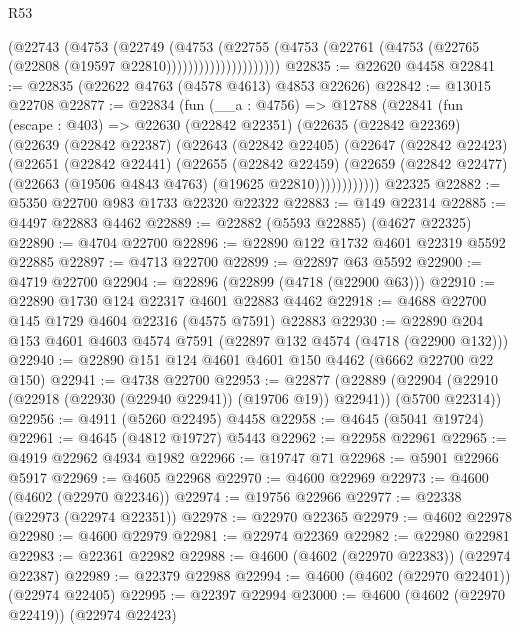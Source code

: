 \begin{lexlean}{R53}
\begin{coremodule}
                        (@22743
                          (@4753
                            (@22749
                              (@4753
                                (@22755
                                  (@4753
                                    (@22761
                                      (@4753 (@22765 (@22808 (@19597 @22810)))))))))))))))))))))
@22835 := @22620 @4458
@22841 := @22835 (@22622 @4763 (@4578 @4613) @4853 @22626)
@22842 := @13015 @22708
@22877 := @22834
    (fun (__a : @4756) =>
    @12788
      (@22841
        (fun (escape : @403) =>
        @22630
          (@22842 @22351)
          (@22635
            (@22842 @22369)
            (@22639
              (@22842 @22387)
              (@22643
                (@22842 @22405)
                (@22647
                  (@22842 @22423)
                  (@22651
                    (@22842 @22441)
                    (@22655
                      (@22842 @22459)
                      (@22659
                        (@22842 @22477)
                        (@22663 (@19506 @4843 @4763) (@19625 @22810))))))))))))
    @22325
@22882 := @5350 @22700 @983 @1733 @22320 @22322
@22883 := @149 @22314
@22885 := @4497 @22883 @4462
@22889 := @22882 (@5593 @22885) (@4627 @22325)
@22890 := @4704 @22700
@22896 := @22890 @122 @1732 @4601 @22319 @5592 @22885
@22897 := @4713 @22700
@22899 := @22897 @63 @5592
@22900 := @4719 @22700
@22904 := @22896 (@22899 (@4718 (@22900 @63)))
@22910 := @22890 @1730 @124 @22317 @4601 @22883 @4462
@22918 := @4688 @22700 @145 @1729 @4604 @22316 (@4575 @7591) @22883
@22930 := @22890 @204 @153 @4601 @4603 @4574 @7591 (@22897 @132 @4574 (@4718 (@22900 @132)))
@22940 := @22890 @151 @124 @4601 @4601 @150 @4462 (@6662 @22700 @22 @150)
@22941 := @4738 @22700
@22953 := @22877
    (@22889 (@22904 (@22910 (@22918 (@22930 (@22940 @22941)) (@19706 @19)) @22941)) (@5700 @22314))
@22956 := @4911 (@5260 @22495) @4458
@22958 := @4645 (@5041 @19724)
@22961 := @4645 (@4812 @19727) @5443
@22962 := @22958 @22961
@22965 := @4919 @22962 @4934 @1982
@22966 := @19747 @71
@22968 := @5901 @22966 @5917
@22969 := @4605 @22968
@22970 := @4600 @22969
@22973 := @4600 (@4602 (@22970 @22346))
@22974 := @19756 @22966
@22977 := @22338 (@22973 (@22974 @22351))
@22978 := @22970 @22365
@22979 := @4602 @22978
@22980 := @4600 @22979
@22981 := @22974 @22369
@22982 := @22980 @22981
@22983 := @22361 @22982
@22988 := @4600 (@4602 (@22970 @22383)) (@22974 @22387)
@22989 := @22379 @22988
@22994 := @4600 (@4602 (@22970 @22401)) (@22974 @22405)
@22995 := @22397 @22994
@23000 := @4600 (@4602 (@22970 @22419)) (@22974 @22423)

\end{coremodule}
\end{lexlean}
